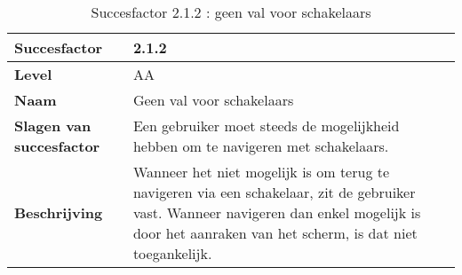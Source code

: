 \begin{table}[H]
    \centering
    \caption{Succesfactor 2.1.2 : geen val voor schakelaars}
    \hspace*{-1cm}\begin{tabular}{|l|p{12cm}|} 
        \hline
        \textbf{Succesfactor}                 & 2.1.2                                                                                                                                                                                                                                                                                                                                                                                                                                                                                                             \\ 
        \hline
        \textbf{Level}                        & AA                                                                                                                                                                                                                                                                                                                                                                                                                                                                                                                 \\ 
        \hline
        \textbf{Naam}                         & Geen val voor schakelaars~                                                                                                                                                                                                                                                                                                                                                                                                                                                                                      \\ 
        \hline
        \textbf{Slagen van succesfactor}      & Een gebruiker moet steeds de mogelijkheid hebben om te navigeren met schakelaars.                                                                                                                                                                                                                                                                                                                    \\ 
        \hline
        \textbf{Beschrijving}                 & Wanneer het niet mogelijk is om terug te navigeren via een schakelaar, zit de gebruiker vast. Wanneer navigeren dan enkel mogelijk is door het aanraken van het scherm, is dat niet toegankelijk. \\ 

\end{tabular}
\end{table}
